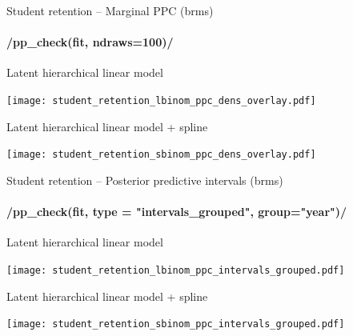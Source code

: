 \documentclass[t]{beamer}
\begin{document}
\begin{frame}[fragile]{Student retention -- Marginal PPC (brms)}
\framesubtitle{\rinline/pp_check(fit, ndraws=100)/}

  
\vspace{-0.75\baselineskip}  
Latent hierarchical linear model\\  
  \begin{minipage}[t][3.6cm][t]{1.0\linewidth}
    \texttt{[image: student\_retention\_lbinom\_ppc\_dens\_overlay.pdf]}
  \end{minipage}
  
\vspace{-0.5\baselineskip}  
Latent hierarchical linear model + spline\\  
  \begin{minipage}[t][3.6cm][t]{1.0\linewidth}
    \texttt{[image: student\_retention\_sbinom\_ppc\_dens\_overlay.pdf]}
  \end{minipage}  

\end{frame}

\begin{frame}[fragile]{Student retention -- Posterior predictive intervals (brms)}
\framesubtitle{\rinline/pp_check(fit, type = "intervals_grouped", group="year")/}

\vspace{-0.8\baselineskip}  
Latent hierarchical linear model\\  
  \hspace{-7mm}
  \begin{minipage}[t][3.6cm][t]{1.0\linewidth}
    \texttt{[image: student\_retention\_lbinom\_ppc\_intervals\_grouped.pdf]}
  \end{minipage}
  
\vspace{-0.5\baselineskip}  
Latent hierarchical linear model + spline\\  
  \hspace{-7mm}
  \begin{minipage}[t][3.6cm][t]{1.0\linewidth}
    \texttt{[image: student\_retention\_sbinom\_ppc\_intervals\_grouped.pdf]}
  \end{minipage}  

\end{frame}
\end{document}
